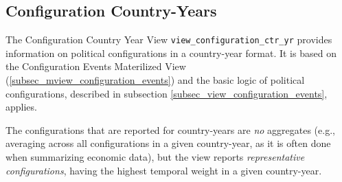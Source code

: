 \subsection{Configuration Country-Years}\label{subsec_view_configuration_ctr_yr}
The Configuration Country Year View \texttt{\footnotesize view\_configuration\_ctr\_yr} provides information on political configurations in a country-year format. 
It is based on the Configuration Events Materilized View (\ref{subsec_mview_configuration_events}) and the basic logic of political configurations, described in subsection \ref{subsec_view_configuration_events}, applies. 

The configurations that are reported for country-years are {\em no} aggregates (e.g., averaging across all configurations in a given country-year, as it is often done when summarizing economic data),
but the view reports {\em representative configurations}, having the highest temporal weight in a given country-year. 

